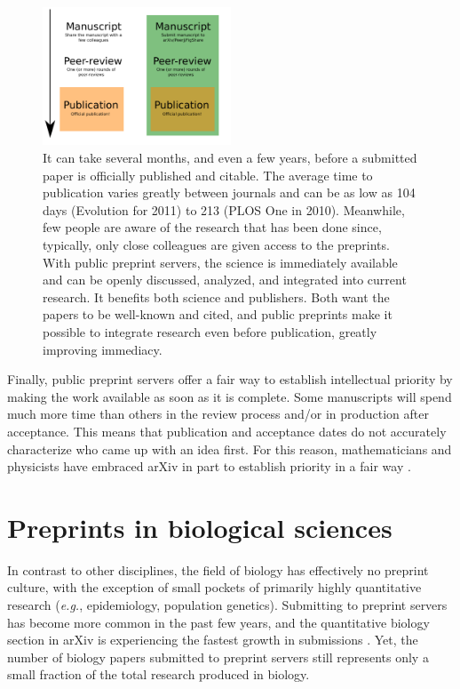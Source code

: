 \documentclass[letterpaper,twocolumn,superscriptaddress,showkeys,longbibliography]{revtex4-1}
\begin{document}
\begin{figure}[ht!] \centering\includegraphics[width=0.50\textwidth]{map.pdf}
\caption { It can take several months, and even a few years, before a submitted
paper is officially published and citable.  The average time to publication
varies greatly between journals and can be as low as 104 days (Evolution for
2011) to 213 (PLOS One in 2010).  Meanwhile, few people are aware of the
research that has been done since, typically, only close colleagues are given
access to the preprints. With public preprint servers, the science is
immediately available and can be openly discussed, analyzed, and integrated into
current research. It benefits both science and publishers. Both want the papers
to be well-known and cited, and public preprints make it possible to integrate
research even before publication, greatly improving immediacy.  }
\label{fig:map} \end{figure}

Finally, public preprint servers offer a fair way to establish intellectual
priority by making the work available as soon as it is complete. Some
manuscripts will spend much more time than others in the review process and/or in
production after acceptance. This means that publication and
acceptance dates do not accurately characterize who came up with an idea
first. For this reason, mathematicians and physicists have embraced arXiv in
part to establish priority in a fair way \cite{gin11,cal12}.

\section{Preprints in biological sciences}

In contrast to other disciplines, the field of biology has effectively no
preprint culture, with the exception of small pockets of primarily highly
quantitative research (\emph{e.g.}, epidemiology, population genetics).
Submitting to preprint servers has become more common in the past few years,
and the quantitative biology section in arXiv is experiencing the fastest
growth in submissions \cite{cal12}. Yet, the number of biology papers
submitted to preprint servers still represents only a small fraction of the
total research produced in biology.
\end{document}
